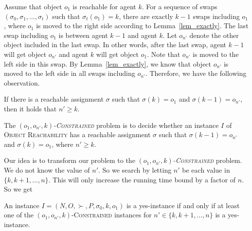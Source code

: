 Assume that object $o_1$ is reachable for agent $k$. For a sequence of swaps $(\sigma _0,\sigma _1,\dots,\sigma _t)$
such that $\sigma _t(o_1)=k$, there are exactly $k-1$ swaps including $o_1$, where $o_1$ is moved to the right side according to
Lemma~\ref{lem_exactly}. The last swap including $o_1$ is between agent $k-1$ and agent $k$.
Let $o_{n'}$ denote the other object included in the last swap. In other words, after the last swap, agent $k-1$ will get object $o_{n'}$ and agent $k$ will get object $o_1$. Note that $o_{n'}$ is moved to the left side in this swap.
By Lemma~\ref{lem_exactly}, we know that object $o_{n'}$ is moved to the left side in all swaps including $o_{n'}$.
Therefore, we have the following observation.




\begin{ob}
    \label{ob_2}
    If there is a reachable assignment $\sigma$ such that $\sigma(k)=o_1$ and $\sigma(k-1)=o_{n'}$, then it holds that $n'\geq k$.
\end{ob}



\begin{definition}
   The \emph{$(o_1,o_{n'},k)$-\textsc{Constrained}} problem is to decide whether an instance $I$ of \textsc{Object Reachability} has a reachable assignment $\sigma$ such that $\sigma(k-1)=o_{n'}$ and $\sigma(k)=o_{1}$, where $n'\geq k$.
\end{definition}


Our idea is to transform our problem to the \emph{$(o_1,o_{n'},k)$-\textsc{Constrained}} problem. We do not know the value of
$n'$. So we search by letting $n'$ be each value in $\{k,k+1,\dots, n\}$. This will only increase the running time bound by a factor of $n$.
So we get


\begin{lemma}\label{lem6}
An instance $I=(N,O,\succ,P,\sigma _0, k, o_1)$ is a yes-instance
if and only if at least one of the $(o_1,o_{n'},k)$-\textsc{Constrained} instances for $n'\in \{k,k+1,\dots, n\}$ is a yes-instance.
\end{lemma}



